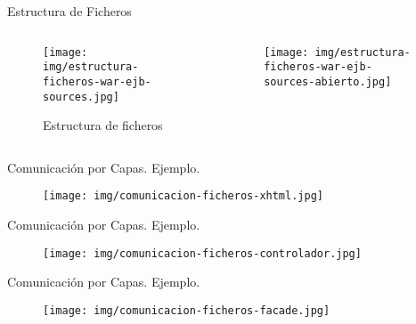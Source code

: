 \documentclass[spanish,xcolor=table,svgnames]{beamer}
\begin{document}
\begin{frame}{Estructura de Ficheros}
  \begin{columns}[onlytextwidth]
    \begin{column}{0.5\textwidth}
      \centering
      \begin{figure}[H]
        \begin{center}
        \texttt{[image: img/estructura-ficheros-war-ejb-sources.jpg]}
        \end{center}
        \caption{Estructura de ficheros}
        \label{fig:estructura-proyecto-4}
      \end{figure}
    \end{column}
    \begin{column}{0.5\textwidth}
      \centering
      \begin{figure}[H]
        \begin{center}
        \texttt{[image: img/estructura-ficheros-war-ejb-sources-abierto.jpg]}
        \end{center}
        \label{fig:estructura-web}
      \end{figure}
    \end{column}
  \end{columns}
\end{frame}


\begin{frame}{Comunicación por Capas. Ejemplo.}
  \begin{figure}[H]
    \begin{center}
        \texttt{[image: img/comunicacion-ficheros-xhtml.jpg]}
    \end{center}
    \label{fig:comunicacion-ficheros-xhtml}
  \end{figure}
\end{frame}

\begin{frame}{Comunicación por Capas. Ejemplo.}
  \begin{figure}[H]
    \begin{center}
        \texttt{[image: img/comunicacion-ficheros-controlador.jpg]}
    \end{center}
    \label{fig:comunicacion-ficheros-controlador}
  \end{figure}
\end{frame}

\begin{frame}{Comunicación por Capas. Ejemplo.}
  \begin{figure}[H]
    \begin{center}
        \texttt{[image: img/comunicacion-ficheros-facade.jpg]}
    \end{center}
    \label{fig:comunicacion-ficheros-facade}
  \end{figure}
\end{frame}
\end{document}
